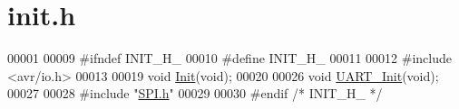 \hypertarget{init_8h_source}{}\section{init.\+h}
\label{init_8h_source}

\begin{DoxyCode}
00001 
00009 \textcolor{preprocessor}{#ifndef INIT\_H\_}
00010 \textcolor{preprocessor}{#define INIT\_H\_}
00011 
00012 \textcolor{preprocessor}{#include <avr/io.h>}
00013 
00019 \textcolor{keywordtype}{void} \hyperlink{init_8h_a7ce0a14b6e7779fbb2d9a05333792c41}{Init}(\textcolor{keywordtype}{void});
00020 
00026 \textcolor{keywordtype}{void} \hyperlink{init_8h_ad5cbed2a2222bb84e8b5c1caaa50634e}{UART\_Init}(\textcolor{keywordtype}{void});
00027 
00028 \textcolor{preprocessor}{#include "\hyperlink{_s_p_i_8h}{SPI.h}"}
00029 
00030 \textcolor{preprocessor}{#endif }\textcolor{comment}{/* INIT\_H\_ */}\textcolor{preprocessor}{}
\end{DoxyCode}
